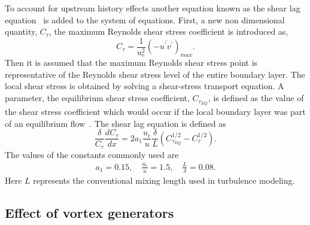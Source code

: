 To account for upstream history effects another equation known as the shear lag equation~\cite{drela1989xfoil,RFOIL1} is added to the system of equations. 
First, a new non dimensional quantity, $C_{\tau}$, the maximum Reynolds shear stress coefficient is introduced as,
\begin{equation}
C_{\tau} = \frac{1}{u_e^2}(-\overline{u^{\prime}v^{\prime}})_{max}.
\end{equation}
Then it is assumed that the maximum Reynolds shear stress point is representative of the Reynolds shear stress level of the entire boundary layer. The local shear stress is obtained by solving a shear-stress transport equation. A parameter, the equilibrium shear stress coefficient, $C_{\tau_{EQ}}$, is defined as the value of the shear stress coefficient which would occur if the local boundary layer was part of an equilibrium flow~\cite{drelaphdthesis,drela1989xfoil}.
The shear lag equation is defined as
\begin{equation}
\frac{\delta}{C_{\tau}}\frac{d C_{\tau}}{d x} = 2a_1\frac{u_e}{u}\frac{\delta}{L}(C_{\tau_{EQ}}^{1/2} - C_{\tau}^{1/2} ).
\label{eq:ctaueq}
\end{equation}
\noindent The values of the constants commonly used are~\cite{drelaphdthesis,drela1989xfoil,RFOIL1}
\begin{align*}
a_1 = 0.15, \quad
\frac{u_e}{u} = 1.5, \quad
\frac{L}{\delta} = 0.08.
\end{align*}
Here $L$ represents the conventional mixing length used in turbulence modeling.

\subsection{Effect of vortex generators}
